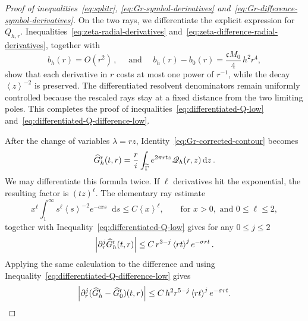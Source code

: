 \documentclass[a4paper,12pt]{amsart} %
\theoremstyle{plain}
\theoremstyle{definition}
\newcommand		{\lt}			{\left}				%
\newcommand		{\rt}			{\right}			%
\renewcommand	{\(}			{\lt(}
\renewcommand	{\)}			{\rt)}
\newcommand		{\bangle}[1]	{\lt\langle #1\rt\rangle}
\newcommand		{\weight}[1]	{\bangle{#1}}	%
\newcommand		{\n}[1]			{\lt\lvert{#1}\rt\rvert}	%
\renewcommand		{\d}		{\mathop{}\!\mathrm{d}}		%
\newcommand	{\h}			{h}
\newcommand		{\CK}			{\mathfrak{c}}	%
\newcommand		{\hatG}			{\widehat{G}}
\newcommand		{\hatGr}		{\hatG^{\textnormal{r}}}
\begin{document}
\begin{proof}[Proof of inequalities~\eqref{eq:splitr}, \eqref{eq:Gr-symbol-derivatives} and~\eqref{eq:Gr-difference-symbol-derivatives}]
		On the two rays, we differentiate the explicit expression for $Q_{\h,r}$. Inequalities~\eqref{eq:zeta-radial-derivatives} and~\eqref{eq:zeta-difference-radial-derivatives}, together with
		\begin{equation*}
			b_\h(r) = O(r^2) \, , \quad \text{ and } \quad b_\h(r)-b_0(r) = \frac{\CK M_0}{4} \, h^2r^4 ,
		\end{equation*}
		show that each derivative in $r$ costs at most one power of $r^{-1}$, while the decay $\weight{z}^{-2}$ is preserved. The differentiated resolvent denominators remain uniformly controlled because the rescaled rays stay at a fixed distance from the two limiting poles. This completes the proof of inequalities~\eqref{eq:differentiated-Q-low} and~\eqref{eq:differentiated-Q-difference-low}.

		After the change of variables $\lambda=rz$, Identity~\eqref{eq:Gr-corrected-contour} becomes
		\begin{equation}\label{eq:scaled-Gr-contour}
			\hatGr_\h(t,r) =\frac{r}{i}\int_{\widetilde\Gamma} e^{2\pi rtz}\mathscr Q_\h(r,z) \d z \, .
		\end{equation}
		We may differentiate this formula twice. If $\ell$ derivatives hit the exponential, the resulting factor is $(tz)^\ell$. The elementary ray estimate
		\begin{equation*} %
			x^\ell\int_1^\infty s^\ell\weight{s}^{-2}e^{-cxs} \d s
			\leq C\weight{x}^{\ell} ,
			\qquad \text{for } x>0, \text{ and } 0\leq\ell\leq 2 ,
		\end{equation*}
		together with Inequality~\eqref{eq:differentiated-Q-low} gives for any $0\leq j\leq2$
		\begin{equation}\label{eq:radial-Gr-derivatives-low}
			\n{\partial_r^j\hatGr_\h(t,r)} \leq C \, r^{3-j} \weight{rt}^{j} e^{-\sigma rt} \, .
		\end{equation}
		Applying the same calculation to the difference and using Inequality~\eqref{eq:differentiated-Q-difference-low} gives
		\begin{equation}\label{eq:radial-Gr-difference-derivatives-low}
			\n{\partial_r^j(\hatGr_\h-\hatGr_0)(t,r)} \leq C\, h^2 r^{5-j} \weight{rt}^{j} e^{-\sigma rt}.
		\end{equation}


\end{proof}
\end{document}
